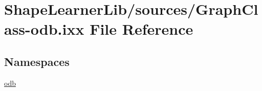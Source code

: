 \hypertarget{_graph_class-odb_8ixx}{}\section{Shape\+Learner\+Lib/sources/\+Graph\+Class-\/odb.ixx File Reference}
\label{_graph_class-odb_8ixx}
\subsection*{Namespaces}
\begin{DoxyCompactItemize}
\item 
 \hyperlink{namespaceodb}{odb}
\end{DoxyCompactItemize}
